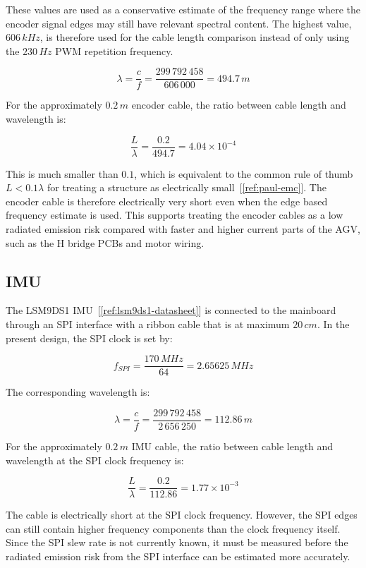 These values are used as a conservative estimate of the frequency range where the encoder
signal edges may still have relevant spectral content. The highest value, \(606\,kHz\), is
therefore used for the cable length comparison instead of only using the \(230\,Hz\) PWM
repetition frequency.

\begin{equation}
\lambda =
\frac{c}{f} =
\frac{299\,792\,458}{606\,000}
= 494.7\,m
\end{equation}

For the approximately \(0.2\,m\) encoder cable, the ratio between cable length and
wavelength is:

\begin{equation}
\frac{L}{\lambda} =
\frac{0.2}{494.7}
= 4.04 \times 10^{-4}
\end{equation}

This is much smaller than \(0.1\), which is equivalent to the common rule of thumb
\(L < 0.1\lambda\) for treating a structure as electrically small~[\ref{ref:paul-emc}].
The encoder cable is therefore
electrically very short even when the edge based frequency estimate is used. This supports
treating the encoder cables as a low radiated emission risk compared with faster and
higher current parts of the AGV, such as the H bridge PCBs and motor wiring.
\subsection{IMU}

The LSM9DS1 IMU~[\ref{ref:lsm9ds1-datasheet}] is connected to the mainboard through an
SPI interface with a ribbon cable that is at maximum \(20\,cm\). In the present design, the
SPI clock is set by:

\[
f_{SPI} =
\frac{170\,MHz}{64}
=
2.65625\,MHz
\]

The corresponding wavelength is:

\[
\lambda =
\frac{c}{f} =
\frac{299\,792\,458}{2\,656\,250}
=
112.86\,m
\]

For the approximately \(0.2\,m\) IMU cable, the ratio between cable length and wavelength
at the SPI clock frequency is:

\[
\frac{L}{\lambda} =
\frac{0.2}{112.86}
=
1.77 \times 10^{-3}
\]

The cable is electrically short at the SPI clock frequency. However, the SPI edges can still contain higher frequency components than the clock frequency itself. Since the SPI slew rate is not currently known, it must be measured before the radiated emission risk from the SPI interface can be estimated more accurately.

